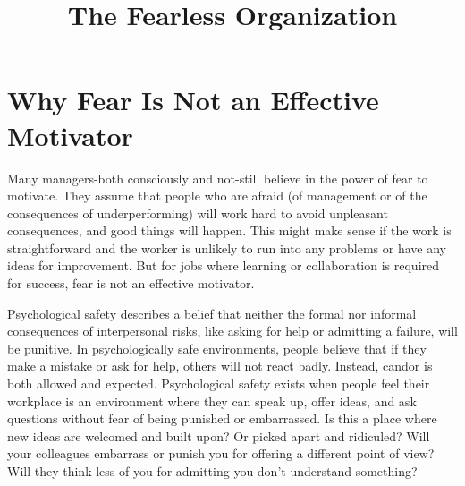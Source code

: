 \documentclass[ebook,12pt,oneside,openany]{memoir}
\begin{document}
\title{The Fearless Organization}
\maketitle

\section{Why Fear Is Not an Effective Motivator}
Many managers-both consciously and not-still believe in the power of fear to motivate.
They assume that people who are afraid (of management or of the consequences of underperforming) will work hard to avoid unpleasant consequences, and good things will happen.
This might make sense if the work is straightforward and the worker is unlikely to run into any problems or have any ideas for improvement.
But for jobs where learning or collaboration is required for success, fear is not an effective motivator.

Psychological safety describes a belief that neither the formal nor informal consequences of interpersonal risks, like asking for help or admitting a failure, will be punitive.
In psychologically safe environments, people believe that if they make a mistake or ask for help, others will not react badly. Instead, candor is both allowed and expected.
Psychological safety exists when people feel their workplace is an environment where they can speak up, offer ideas, and ask questions without fear of being punished or embarrassed. 
Is this a place where new ideas are welcomed and built upon? Or picked apart and ridiculed? Will your colleagues embarrass or punish you for offering a different point of view?
Will they think less of you for admitting you don't understand something?
\end{document}

